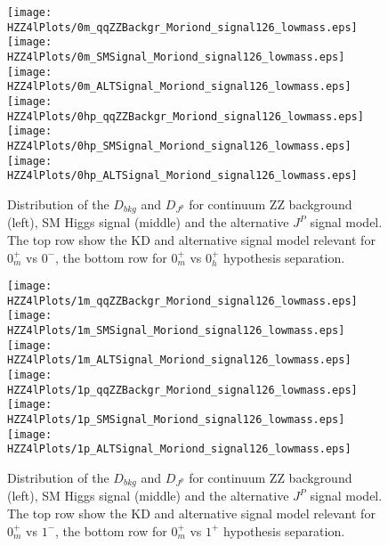 \begin{figure}
\begin{center}
\texttt{[image: HZZ4lPlots/0m\_qqZZBackgr\_Moriond\_signal126\_lowmass.eps]}
\texttt{[image: HZZ4lPlots/0m\_SMSignal\_Moriond\_signal126\_lowmass.eps]}
\texttt{[image: HZZ4lPlots/0m\_ALTSignal\_Moriond\_signal126\_lowmass.eps]}
\texttt{[image: HZZ4lPlots/0hp\_qqZZBackgr\_Moriond\_signal126\_lowmass.eps]}
\texttt{[image: HZZ4lPlots/0hp\_SMSignal\_Moriond\_signal126\_lowmass.eps]}
\texttt{[image: HZZ4lPlots/0hp\_ALTSignal\_Moriond\_signal126\_lowmass.eps]}
\label{fig:HZZ4lspin0KDvSKD}
\caption{Distribution of the $D_{bkg}$ and $D_{J^p}$ for continuum
ZZ background (left), SM Higgs signal (middle) and the 
alternative $J^P$ signal model.  The top row show the KD and 
alternative signal model relevant for $0_m^+$ vs $0^-$, the 
bottom row for $0_m^+$ vs $0_h^+$ hypothesis separation.}
\end{center}
\end{figure}

\begin{figure}
\begin{center}
\texttt{[image: HZZ4lPlots/1m\_qqZZBackgr\_Moriond\_signal126\_lowmass.eps]}
\texttt{[image: HZZ4lPlots/1m\_SMSignal\_Moriond\_signal126\_lowmass.eps]}
\texttt{[image: HZZ4lPlots/1m\_ALTSignal\_Moriond\_signal126\_lowmass.eps]}
\texttt{[image: HZZ4lPlots/1p\_qqZZBackgr\_Moriond\_signal126\_lowmass.eps]}
\texttt{[image: HZZ4lPlots/1p\_SMSignal\_Moriond\_signal126\_lowmass.eps]}
\texttt{[image: HZZ4lPlots/1p\_ALTSignal\_Moriond\_signal126\_lowmass.eps]}
\label{fig:HZZ4lspin1KDvSKD}
\caption{Distribution of the $D_{bkg}$ and $D_{J^p}$ for continuum
ZZ background (left), SM Higgs signal (middle) and the 
alternative $J^P$ signal model.  The top row show the KD and 
alternative signal model relevant for $0_m^+$ vs $1^-$, the 
bottom row for $0_m^+$ vs $1^+$ hypothesis separation.}
\end{center}
\end{figure}

